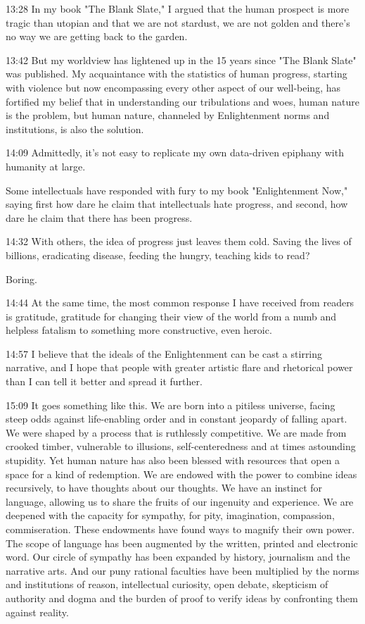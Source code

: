 \documentclass[10pt,titlepage]{article}
\begin{document}
13:28
In my book "The Blank Slate,"
I argued that the human prospect is more tragic than utopian
and that we are not stardust, we are not golden
and there's no way we are getting back to the garden.

13:42
But my worldview has lightened up
in the 15 years since "The Blank Slate" was published.
My acquaintance with the statistics of human progress,
starting with violence
but now encompassing every other aspect of our well-being,
has fortified my belief
that in understanding our tribulations and woes,
human nature is the problem,
but human nature, channeled by Enlightenment norms and institutions,
is also the solution.

14:09
Admittedly, it's not easy to replicate my own data-driven epiphany
with humanity at large.

Some intellectuals have responded
with fury to my book "Enlightenment Now,"
saying first how dare he claim that intellectuals hate progress,
and second, how dare he claim that there has been progress.

14:32
With others, the idea of progress just leaves them cold.
Saving the lives of billions,
eradicating disease, feeding the hungry,
teaching kids to read?

Boring.

14:44
At the same time, the most common response I have received from readers is gratitude,
gratitude for changing their view of the world
from a numb and helpless fatalism
to something more constructive,
even heroic.

14:57
I believe that the ideals of the Enlightenment
can be cast a stirring narrative,
and I hope that people with greater artistic flare
and rhetorical power than I
can tell it better and spread it further.

15:09
It goes something like this.
We are born into a pitiless universe,
facing steep odds against life-enabling order
and in constant jeopardy of falling apart.
We were shaped by a process that is ruthlessly competitive.
We are made from crooked timber,
vulnerable to illusions, self-centeredness
and at times astounding stupidity.
Yet human nature has also been blessed with resources
that open a space for a kind of redemption.
We are endowed with the power to combine ideas recursively,
to have thoughts about our thoughts.
We have an instinct for language,
allowing us to share the fruits of our ingenuity and experience.
We are deepened with the capacity for sympathy,
for pity, imagination, compassion, commiseration.
These endowments have found ways to magnify their own power.
The scope of language has been augmented
by the written, printed and electronic word.
Our circle of sympathy has been expanded
by history, journalism and the narrative arts.
And our puny rational faculties have been multiplied
by the norms and institutions of reason,
intellectual curiosity, open debate,
skepticism of authority and dogma
and the burden of proof to verify ideas
by confronting them against reality.
\end{document}
